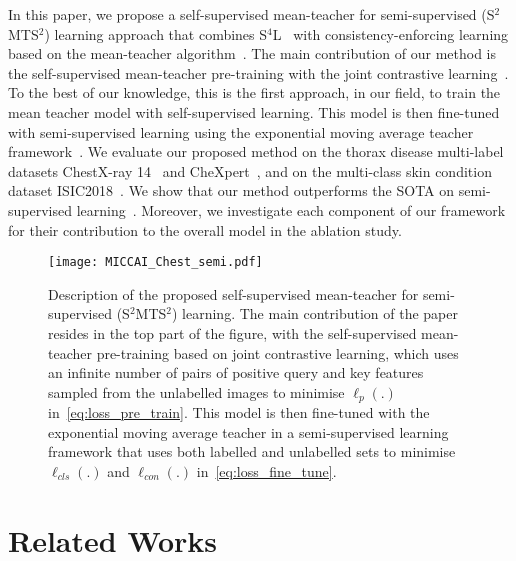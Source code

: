 \documentclass[runningheads]{llncs}
\begin{document}
In this paper, we propose a self-supervised mean-teacher for semi-supervised (S$^2$MTS$^2$) learning approach that combines S$^4$L~\cite{chen2020big,zhai2019s4l} with consistency-enforcing learning based on the mean-teacher algorithm~\cite{tarvainen2017mean}.
The main contribution of our method is the self-supervised mean-teacher pre-training with the joint contrastive learning~\cite{cai2020joint}. To the best of our knowledge, this is the first approach, in our field, to train the mean teacher model with self-supervised learning.
This model is then fine-tuned with semi-supervised learning using the exponential moving average teacher framework~\cite{tarvainen2017mean}.
We evaluate our proposed method on the thorax disease multi-label datasets ChestX-ray 14~\cite{wang2017chestx} and CheXpert~\cite{irvin2019chexpert}, and on the multi-class skin condition dataset ISIC2018~\cite{tschandl2018ham10000, codella2019skin}.
We show that our method outperforms the SOTA on semi-supervised learning~\cite{aviles2019graphx,liu2020semi,gyawali2020semi,unnikrishnan2020semi}. Moreover, we investigate each component of our framework for their contribution to the overall model in the ablation study. 






\begin{figure}[t!]
\begin{center}

\texttt{[image: MICCAI\_Chest\_semi.pdf]}
\end{center}
\vspace{-.5in}
  \caption{Description of the proposed 
  self-supervised mean-teacher for semi-supervised (S$^2$MTS$^2$) learning.
  The main contribution of the paper resides in the top part of the figure, with the self-supervised mean-teacher pre-training based on joint contrastive learning, which uses an infinite number of pairs of positive query and key features sampled from the unlabelled images to minimise $\ell_p(.)$ in~\eqref{eq:loss_pre_train}.
  This model is then fine-tuned with the exponential moving average teacher in a semi-supervised learning framework that uses both labelled and unlabelled sets to minimise $\ell_{cls}(.)$ and $\ell_{con}(.)$ in~\eqref{eq:loss_fine_tune}.
} 
\label{fig:framework}
\end{figure}

\vspace{-.1in}
\section{Related Works}
\end{document}
